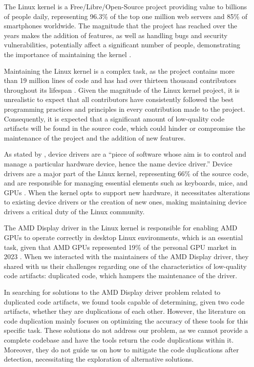 \en

The Linux kernel is a Free/Libre/Open-Source project providing value to
billions of people daily, representing 96.3\% of the top one million web
servers and 85\% of smartphones worldwide. The magnitude that the project has
reached over the years makes the addition of features, as well as handling bugs
and security vulnerabilities, potentially affect a significant number of
people, demonstrating the importance of maintaining the kernel
\citep{linuxdata}.

Maintaining the Linux kernel is a complex task, as the project contains more
than 19 million lines of code and has had over thirteen thousand contributors
throughout its lifespan \citep{linuxquantity}. Given the magnitude of the Linux
kernel project, it is unrealistic to expect that all contributors have
consistently followed the best programming practices and principles in every
contribution made to the project. Consequently, it is expected that a
significant amount of low-quality code artifacts will be found in the source
code, which could hinder or compromise the maintenance of the project and the
addition of new features.

As stated by \citet{driverdef}, device drivers are a ``piece of software whose
aim is to control and manage a particular hardware device, hence the name
device driver.'' Device drivers are a major part of the Linux kernel,
representing 66\% of the source code, and are responsible for managing
essential elements such as keyboards, mice, and GPUs \citep{marcelo}. When the
kernel opts to support new hardware, it necessitates alterations to existing
device drivers or the creation of new ones, making maintaining device drivers a
critical duty of the Linux community.

The AMD Display driver in the Linux kernel is responsible for enabling AMD GPUs
to operate correctly in desktop Linux environments, which is an essential task,
given that AMD GPUs represented 19\% of the personal GPU market in 2023
\citep{gpumarket}. When we interacted with the maintainers of the AMD Display
driver, they shared with us their challenges regarding one of the
characteristics of low-quality code artifacts: duplicated code, which hampers
the maintenance of the driver.


In searching for solutions to the AMD Display driver problem related to
duplicated code artifacts, we found tools capable of determining, given two
code artifacts, whether they are duplications of each other. However, the
literature on code duplication mainly focuses on optimizing the accuracy
of these tools for this specific task. These solutions do not address our
problem, as we cannot provide a complete codebase and have the tools return the
code duplications within it. Moreover, they do not guide us on how to mitigate
the code duplications after detection, necessitating the exploration of
alternative solutions.


